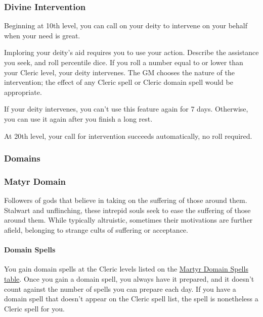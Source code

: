 \subsubsection{Divine Intervention}\label{Cleric_divine-intervention}

Beginning at 10th level, you can call on your deity to intervene on your
behalf when your need is great.

Imploring your deity's aid requires you to use your action. Describe the
assistance you seek, and roll percentile dice. If you roll a number
equal to or lower than your Cleric level, your deity intervenes. The GM
chooses the nature of the intervention; the effect of any Cleric spell
or Cleric domain spell would be appropriate.

If your deity intervenes, you can't use this feature again for 7 days.
Otherwise, you can use it again after you finish a long rest.

At 20th level, your call for intervention succeeds automatically, no
roll required.

\subsubsection{Domains}\label{Cleric_domains}

\subsubsection{Matyr Domain}\label{Martyr_Domain_matyr-domain}

Followers of gods that believe in taking on the suffering of those
around them. Stalwart and unflinching, these intrepid souls seek to ease
the suffering of those around them. While typically altruistic,
sometimes their motivations are further afield, belonging to strange
cults of suffering or acceptance.

\paragraph{Domain Spells}\label{Martyr_Domain_domain-spells}

You gain domain spells at the Cleric levels listed on the
\hyperref[cleric-domain-martry-spells-table]{Martyr Domain Spells
table}. Once you gain a domain spell, you always have it prepared, and
it doesn't count against the number of spells you can prepare each day.
If you have a domain spell that doesn't appear on the Cleric spell list,
the spell is nonetheless a Cleric spell for you.

